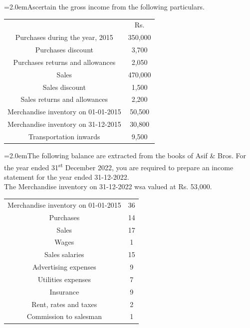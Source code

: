 \documentclass[11pt,a4paper]{article}
\newcommand{\lqn}[2]{\Needspace{6\baselineskip}\par\medskip\noindent\hangindent=2.0em\hangafter=1\makebox[2.0em][l]{\textbf{#1.}}#2\par}
\begin{document}
\lqn{115}{Ascertain the gross income from the following particulars.\par
\par\smallskip\noindent\hspace*{1.2em}\begin{tabular}{|cc|}
\hline
 & Rs. \\
Purchases during the year, 2015 & 350,000 \\
Purchases discount & 3,700 \\
Purchases returns and allowances & 2,050 \\
Sales & 470,000 \\
Sales discount & 1,500 \\
Sales returns and allowances & 2,200 \\
Merchandise inventory on 01-01-2015 & 50,500 \\
Merchandise inventory on 31-12-2015 & 30,800 \\
Transportation inwards & 9,500 \\
\hline
\end{tabular}\par\smallskip
}
\lqn{116}{The following balance are extracted from the books of Asif \& Bros. For the year ended 31\textsuperscript{st} December 2022, you are required to prepare an income statement for the year ended 31-12-2022.\\
The Merchandise inventory on 31-12-2022 wsa valued at Rs. 53,000.\par
\par\smallskip\noindent\hspace*{1.2em}\begin{tabular}{|cc|}
\hline
Merchandise inventory on 01-01-2015 & 36 \\
Purchases & 14 \\
Sales & 17 \\
Wages & 1 \\
Sales salaries & 15 \\
Advertising expenses & 9 \\
Utilities expenses & 7 \\
Insurance & 9 \\
Rent, rates and taxes & 2 \\
Commission to salesman & 1 \\
\hline
\end{tabular}\par\smallskip
}
\end{document}
